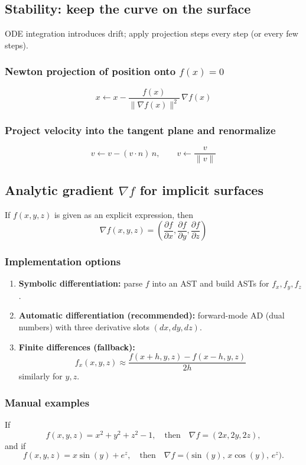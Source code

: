 \documentclass[12pt,a4paper]{article}
\theoremstyle{plain}
\theoremstyle{definition}
\begin{document}
	\subsection{Stability: keep the curve on the surface}
	ODE integration introduces drift; apply projection steps every step (or every few steps).
	
		\subsubsection*{Newton projection of position onto $f(x)=0$}
	\[
	\boxed{
		x \leftarrow x - \frac{f(x)}{\|\nabla f(x)\|^2}\,\nabla f(x)
	}
	\]
	
		\subsubsection*{Project velocity into the tangent plane and renormalize}
	\[
	\boxed{
		v \leftarrow v - (v\cdot n)\,n,\qquad v\leftarrow \frac{v}{\|v\|}
	}
	\]
	
	\subsection{Analytic gradient $\nabla f$ for implicit surfaces}
	If $f(x,y,z)$ is given as an explicit expression, then
	\[
	\boxed{
		\nabla f(x,y,z)=\left(\frac{\partial f}{\partial x},\frac{\partial f}{\partial y},\frac{\partial f}{\partial z}\right)
	}
	\]
	
		\subsubsection*{Implementation options}
	\begin{enumerate}
		\item \textbf{Symbolic differentiation:} parse $f$ into an AST and build ASTs for $f_x,f_y,f_z$.
		\item \textbf{Automatic differentiation (recommended):} forward-mode AD (dual numbers) with three derivative slots $(dx,dy,dz)$.
		\item \textbf{Finite differences (fallback):}
		\[
		f_x(x,y,z)\approx \frac{f(x+h,y,z)-f(x-h,y,z)}{2h}
		\]
		similarly for $y,z$.
	\end{enumerate}
	
		\subsubsection*{Manual examples}
	If
	\[
	f(x,y,z)=x^2+y^2+z^2-1,
	\quad\text{then}\quad
	\nabla f=(2x,2y,2z),
	\]
	and if
	\[
	f(x,y,z)=x\sin(y)+e^z,
	\quad\text{then}\quad
	\nabla f=\bigl(\sin(y),\,x\cos(y),\,e^z\bigr).
	\]
	
\end{document}
